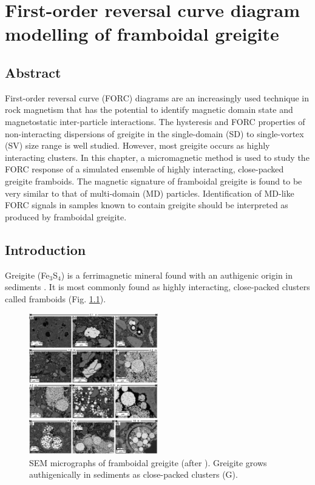 \chapter{First-order reversal curve diagram modelling of framboidal greigite}
\label{ch:res-4}
\fancyhead[C]{}
\fancyhead[R]{}
\fancyfoot[C]{\thepage}

\section*{Abstract}
First-order reversal curve (FORC) diagrams are an increasingly used technique in rock magnetism that has the potential to identify magnetic domain state and magnetostatic inter-particle interactions. The hysteresis and FORC properties of non-interacting dispersions of greigite in the single-domain (SD) to single-vortex (SV) size range is well studied. However, most greigite occurs as highly interacting clusters. In this chapter, a micromagnetic method is used to study the FORC response of a simulated ensemble of highly interacting, close-packed greigite framboids. The magnetic signature of framboidal greigite is found to be very similar to that of multi-domain (MD) particles. Identification of MD-like FORC signals in samples known to contain greigite should be interpreted as produced by framboidal greigite.

\section{Introduction}
Greigite (Fe$_3$S$_4$) is a ferrimagnetic mineral found with an authigenic origin in sediments \citep{Roberts2011}. It is most commonly found as highly interacting, close-packed clusters called framboids \citep{Rowan2006,Rowan2009,Roberts2011} (Fig. \ref{FIG_00}).
\begin{figure}
\centering
\includegraphics[width=0.5\textwidth]{research-4/figs/framboids_rowan.pdf}
\caption[SEM micrographs of framboidal greigite]{SEM micrographs of framboidal greigite (after \citet{Rowan2009}). Greigite grows authigenically in sediments as close-packed clusters (G).}
\label{FIG_00}
\end{figure}\par

